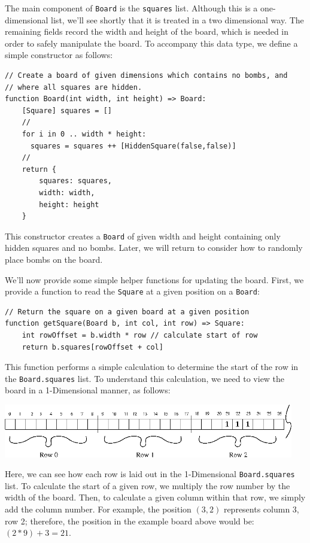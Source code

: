 The main component of \lstinline{Board} is the \lstinline{squares} list.  Although this is a one-dimensional list, we'll see shortly that it is treated in a two dimensional way.  The remaining fields record the width and height of the board, which is needed in order to safely manipulate the board.  To accompany this data type, we define a simple constructor as follows:
\begin{lstlisting}
// Create a board of given dimensions which contains no bombs, and
// where all squares are hidden.
function Board(int width, int height) => Board:
    [Square] squares = []
    //
    for i in 0 .. width * height:
      squares = squares ++ [HiddenSquare(false,false)]
    //
    return {
        squares: squares,
        width: width,
        height: height
    }
\end{lstlisting}
This constructor creates a \lstinline{Board} of given width and height containing only hidden squares and no bombs.  Later, we will return to consider how to randomly place bombs on the board.

We'll now provide some simple helper functions for updating the board.  First, we provide a function to read the \lstinline{Square} at a given position on a \lstinline{Board}:

\begin{lstlisting}
// Return the square on a given board at a given position
function getSquare(Board b, int col, int row) => Square:
    int rowOffset = b.width * row // calculate start of row
    return b.squares[rowOffset + col]
\end{lstlisting}

This function performs a simple calculation to determine the start of the row in the \lstinline{Board.squares} list.  To understand this calculation, we need to view the board in a 1-Dimensional manner, as follows:

\begin{center}
\includegraphics[width=0.95\textwidth]{../images/kmines_flat.png}
\end{center}

Here, we can see how each row is laid out in the 1-Dimensional \lstinline{Board.squares} list.  To calculate the start of a given row, we multiply the row number by the width of the board.  Then, to calculate a given column within that row, we simply add the column number.  For example, the position $(3,2)$ represents column 3, row 2; therefore, the position in the example board above would be: $(2 * 9) + 3 = 21$.

